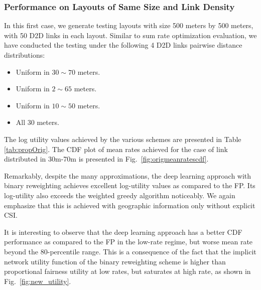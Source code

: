 \documentclass[journal,12pt,onecolumn,draftclsnofoot,]{IEEEtran}
\begin{document}
\subsubsection{Performance on Layouts of Same Size and Link Density}

In this first case, we generate testing layouts with size 500
meters by 500 meters, with 50 D2D links in each layout. Similar to sum rate optimization evaluation, we have conducted the testing under the following 4 D2D links pairwise distance distributions: 
\begin{itemize}
    \item Uniform in $30\sim70$ meters.
    \item Uniform in $2\sim65$ meters.
    \item Uniform in $10\sim50$ meters.
    \item All $30$ meters.
\end{itemize}
The log utility values achieved by the various schemes are presented in Table
\ref{tab:propOrig}.  The CDF plot of mean rates achieved for the case of link
distributed in 30m-70m is presented in Fig.~\ref{fig:origmeanratescdf}.

Remarkably, despite the many approximations, the deep learning approach with
binary reweighting achieves excellent log-utility values as compared to the FP.
Its log-utility also exceeds the weighted greedy algorithm noticeably. We again
emphasize that this is achieved with geographic information only without
explicit CSI.

It is interesting to observe that the deep learning approach has a better CDF
performance as compared to the FP in the low-rate regime, but worse mean rate
beyond the 80-percentile range. This is a consequence of the fact that the
implicit network utility function of the binary reweighting scheme is higher
than proportional fairness utility at low rates, but saturates at high rate, as
shown in Fig.~\ref{fig:new_utility}.
\end{document}
